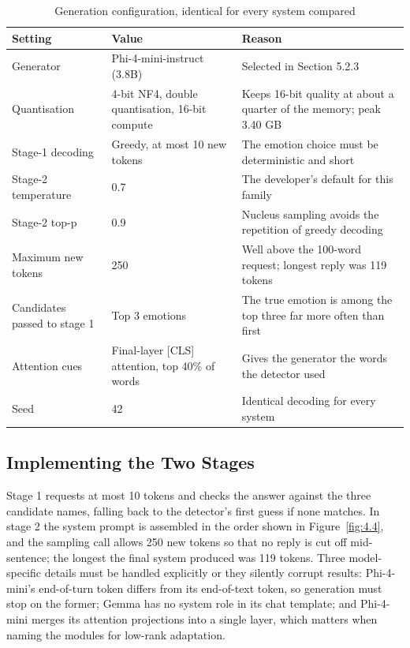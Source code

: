\begin{table}[H]
\centering
\footnotesize
\begin{tabularx}{\textwidth}{@{}lXX@{}}
\toprule
\textbf{Setting} & \textbf{Value} & \textbf{Reason} \\
\midrule
Generator & Phi-4-mini-instruct (3.8B) & Selected in Section 5.2.3 \\
Quantisation & 4-bit NF4, double quantisation, 16-bit compute & Keeps 16-bit quality at about a quarter of the memory; peak 3.40 GB \\
Stage-1 decoding & Greedy, at most 10 new tokens & The emotion choice must be deterministic and short \\
Stage-2 temperature & 0.7 & The developer's default for this family \\
Stage-2 top-p & 0.9 & Nucleus sampling avoids the repetition of greedy decoding \\
Maximum new tokens & 250 & Well above the 100-word request; longest reply was 119 tokens \\
Candidates passed to stage 1 & Top 3 emotions & The true emotion is among the top three far more often than first \\
Attention cues & Final-layer [CLS] attention, top 40\% of words & Gives the generator the words the detector used \\
Seed & 42 & Identical decoding for every system \\
\bottomrule
\end{tabularx}
\caption{Generation configuration, identical for every system compared}
\label{tab:4.9}
\end{table}

\subsection{Implementing the Two Stages}

Stage 1 requests at most 10 tokens and checks the answer against the three candidate names, falling back to the detector's first guess if none matches. In stage 2 the system prompt is assembled in the order shown in Figure~\ref{fig:4.4}, and the sampling call allows 250 new tokens so that no reply is cut off mid-sentence; the longest the final system produced was 119 tokens. Three model-specific details must be handled explicitly or they silently corrupt results: Phi-4-mini's end-of-turn token differs from its end-of-text token, so generation must stop on the former; Gemma has no system role in its chat template; and Phi-4-mini merges its attention projections into a single layer, which matters when naming the modules for low-rank adaptation.

